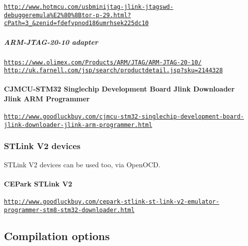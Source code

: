 \href{http://www.hotmcu.com/usbminijtag-jlink-jtagswd-debuggeremula%E2%80%8Btor-p-29.html?cPath=3_25&zenid=fdefvpnod186umrhsek225dc10}{\tt http\+://www.\+hotmcu.\+com/usbminijtag-\/jlink-\/jtagswd-\/debuggeremula\%\+E2\%80\%8\+Btor-\/p-\/29.\+html?c\+Path=3\+\_\&zenid=fdefvpnod186umrhsek225dc10}



\subparagraph*{A\+R\+M-\/\+J\+T\+A\+G-\/20-\/10 adapter}

\href{https://www.olimex.com/Products/ARM/JTAG/ARM-JTAG-20-10/}{\tt https\+://www.\+olimex.\+com/\+Products/\+A\+R\+M/\+J\+T\+A\+G/\+A\+R\+M-\/\+J\+T\+A\+G-\/20-\/10/} \href{http://uk.farnell.com/jsp/search/productdetail.jsp?sku=2144328}{\tt http\+://uk.\+farnell.\+com/jsp/search/productdetail.\+jsp?sku=2144328}



\paragraph*{C\+J\+M\+C\+U-\/\+S\+T\+M32 Singlechip Development Board Jlink Downloader Jlink A\+R\+M Programmer}





\href{http://www.goodluckbuy.com/cjmcu-stm32-singlechip-development-board-jlink-downloader-jlink-arm-programmer.html}{\tt http\+://www.\+goodluckbuy.\+com/cjmcu-\/stm32-\/singlechip-\/development-\/board-\/jlink-\/downloader-\/jlink-\/arm-\/programmer.\+html}

\subsubsection*{S\+T\+Link V2 devices}

S\+T\+Link V2 devices can be used too, via Open\+O\+C\+D.

\paragraph*{C\+E\+Park S\+T\+Link V2}



\href{http://www.goodluckbuy.com/cepark-stlink-st-link-v2-emulator-programmer-stm8-stm32-downloader.html}{\tt http\+://www.\+goodluckbuy.\+com/cepark-\/stlink-\/st-\/link-\/v2-\/emulator-\/programmer-\/stm8-\/stm32-\/downloader.\+html}

\subsection*{Compilation options}

